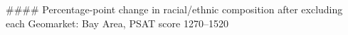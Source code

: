 #### Percentage-point change in racial/ethnic composition after excluding each Geomarket: Bay Area, PSAT score 1270–1520
